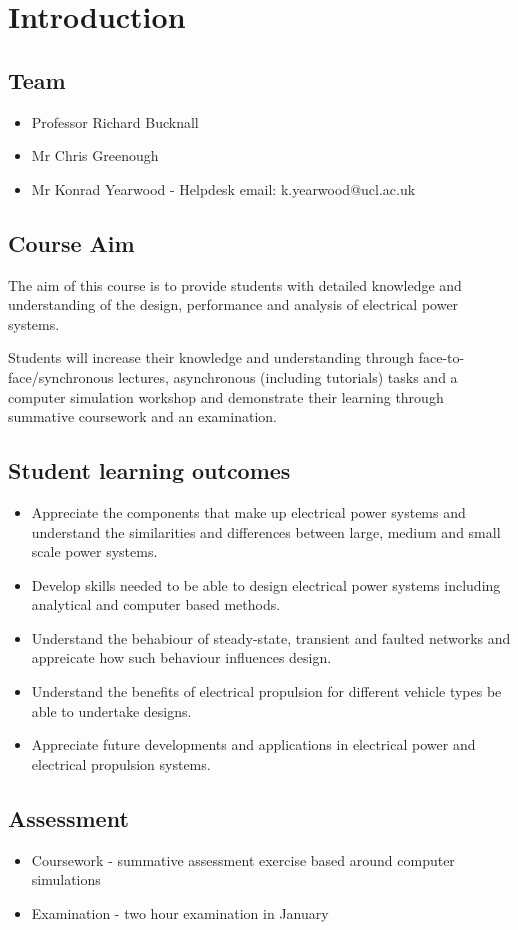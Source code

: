\documentclass[class=report, crop=false, 12pt,a4paper]{standalone}
\begin{document}
\section{Introduction}
\subsection{Team}
\begin{itemize}
	\item Professor Richard Bucknall
	\item Mr Chris Greenough
	\item Mr Konrad Yearwood - Helpdesk email: k.yearwood@ucl.ac.uk
\end{itemize}
\subsection{Course Aim}
The aim of this course is to provide students with detailed knowledge and understanding of the design, performance and analysis of electrical power systems.

Students will increase their knowledge and understanding through face-to-face/synchronous lectures, asynchronous (including tutorials) tasks and a computer simulation workshop and demonstrate their learning through summative coursework and an examination.
\subsection{Student learning outcomes}
\begin{itemize}
	\item Appreciate the components that make up electrical power systems and understand the similarities and differences between large, medium and small scale power systems.
	\item Develop skills needed to be able to design electrical power systems including analytical and computer based methods.
	\item Understand the behabiour of steady-state, transient and faulted networks and appreicate how such behaviour influences design.
	\item Understand the benefits of electrical propulsion for different vehicle types be able to undertake designs.
	\item Appreciate future developments and applications in electrical power and electrical propulsion systems.
\end{itemize}
\subsection{Assessment}
\begin{itemize}
	\item Coursework - summative assessment exercise based around computer simulations
	\item Examination - two hour examination in January
\end{itemize}
\end{document}
